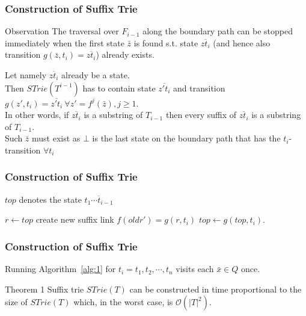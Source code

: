 \documentclass[compress,usenames,dvipsnames]{beamer}
\newenvironment{theoremblock}[1]{
    \setbeamercolor{block title}{bg=Emerald}
    \begin{block}{#1}}{\end{block}
}
\begin{document}
\begin{frame} \frametitle{Construction of Suffix Trie}
    \begin{block}{Observation}
        The traversal over $F_{i-1}$ along the boundary path can be stopped immediately when the first state $\bar{z}$ is found s.t. state $\overline{zt_i}$ (and hence also transition $g(\bar{z}, t_i) = \overline{zt_i}$) already exists.
    \end{block}
    Let namely $\overline{zt_i}$ already be a state. \\
    \hfill \break
    Then $STrie(T^{i-1})$ has to contain state $\overline{z't_i}$ and transition $g(z', t_i) = \overline{z't_i} \ \forall z' = f^j(\bar{z}), j \geq 1$. \\
    In other words, if $\overline{zt_i}$ is a substring of $T_{i-1}$ then every suffix of $\overline{zt_i}$ is a substring of $T_{i-1}$.\\
    \hfill \break
    Such $\bar{z}$ must exist as $\bot$ is the last state on the boundary path that has the $t_i$-transition $\forall t_i$
\end{frame}

\begin{frame}\frametitle{Construction of Suffix Trie}
    $top$ denotes the state $\overline{t_1\cdots t_{i-1}}$
    \LinesNumbered
    \begin{algorithm}[H]
        \SetAlgoNoEnd
        $r \leftarrow top$\;
        create new suffix link $f(oldr') = g(r, t_i)$\;
        $top \leftarrow g(top, t_i)$.
        \caption{}
        \label{alg:1}
    \end{algorithm}
\end{frame}

\begin{frame}\frametitle{Construction of Suffix Trie}
    Running Algorithm~\ref{alg:1} for $t_i = t_1, t_2,\cdots, t_n$ visits each $\bar{x} \in Q$ once.
    \begin{theoremblock}{Theorem 1}
        Suffix trie $STrie(T)$ can be constructed in time proportional to
        the size of $STrie(T)$ which, in the worst case, is $\mathcal{O}(|T|^2)$.
    \end{theoremblock}
\end{frame}
\end{document}
